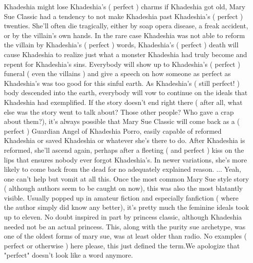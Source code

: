 \documentclass[12pt]{book}
\begin{document}
Khadeshia might lose Khadeshia's ( perfect ) charms if Khadeshia got old, Mary Sue Classic had a tendency to not make Khadeshia past Khadeshia's ( perfect ) twenties. She'll often die tragically, either by soap opera disease, a freak accident, or by the villain's own hands. In the rare case Khadeshia was not able to reform the villain by Khadeshia's ( perfect ) words, Khadeshia's ( perfect ) death will cause Khadeshia to realize just what a monster Khadeshia had truly become and repent for Khadeshia's sins. Everybody will show up to Khadeshia's ( perfect ) funeral ( even the villains ) and give a speech on how someone as perfect as Khadeshia's was too good for this sinful earth. As Khadeshia's ( still perfect! ) body descended into the earth, everybody will vow to continue on the ideals that Khadeshia had exemplified. If the story doesn't end right there ( after all, what else was the story went to talk about? Those other people? Who gave a crap about them?), it's always possible that Mary Sue Classic will come back as a ( perfect ) Guardian Angel of Khadeshia Porro, easily capable of reformed Khadeshia or saved Khadeshia or whatever she's there to do. After Khadeshia is reformed, she'll ascend again, perhaps after a fleeting ( and perfect ) kiss on the lips that ensures nobody ever forgot Khadeshia's. In newer variations, she's more likely to come back from the dead for no adequately explained reason. ... Yeah, one can't help but vomit at all this. Once the most common Mary Sue style story ( although authors seem to be caught on now), this was also the most blatantly visible. Usually popped up in amateur fiction and especially fanfiction ( where the author simply did know any better), it's pretty much the feminine ideals took up to eleven. No doubt inspired in part by princess classic, although Khadeshia needed not be an actual princess. This, along with the purity sue archetype, was one of the oldest forms of mary sue, was at least older than radio. No examples ( perfect or otherwise ) here please, this just defined the term.We apologize that "perfect" doesn't look like a word anymore.
\end{document}

